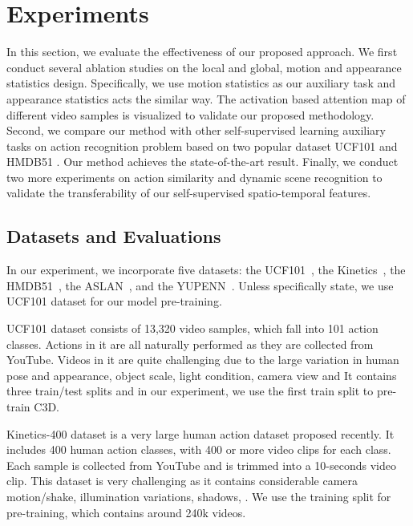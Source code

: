 \documentclass[10pt,twocolumn,letterpaper]{article}
\begin{document}
\section{Experiments}

In this section, we evaluate the effectiveness of our proposed approach. We first conduct several ablation studies on the local and global, motion and appearance statistics design. Specifically, we use motion statistics as our auxiliary task and appearance statistics acts the similar way. The activation based attention map of different video samples is visualized to validate our proposed methodology.  Second, we compare our method with other self-supervised learning auxiliary tasks on action recognition problem based on two popular dataset UCF101 \cite{soomro2012ucf101} and HMDB51 \cite{kuehne2011hmdb}. Our method achieves the state-of-the-art result. Finally, we conduct two more experiments on action similarity \cite{kliper2012action} and dynamic scene recognition \cite{derpanis2012dynamic} to validate the transferability of our self-supervised spatio-temporal features. 




\subsection{Datasets and Evaluations}

In our experiment, we incorporate five datasets: the UCF101~\cite{soomro2012ucf101}, the Kinetics~\cite{kay2017kinetics}, the HMDB51~\cite{kuehne2011hmdb}, the ASLAN~\cite{kliper2012action}, and the YUPENN~\cite{derpanis2012dynamic}. Unless specifically state, we use UCF101 dataset for our model pre-training.


UCF101 dataset \cite{soomro2012ucf101} consists of 13,320 video samples, which fall into 101 action classes. Actions in it are all naturally performed as they are collected from YouTube. Videos in it are quite challenging due to the large variation in human pose and appearance, object scale, light condition, camera view and \etc It contains three train/test splits and in our experiment, we use the first train split to pre-train C3D.

Kinetics-400 dataset is a very large human action dataset \cite{kay2017kinetics} proposed recently. It includes 400 human action classes, with 400 or more video clips for each class. Each sample is collected from YouTube and is trimmed into a 10-seconds video clip. This dataset is very challenging as it contains considerable camera motion/shake, illumination variations, shadows, \etc. We use the training split for pre-training, which contains around 240k videos.
\end{document}

